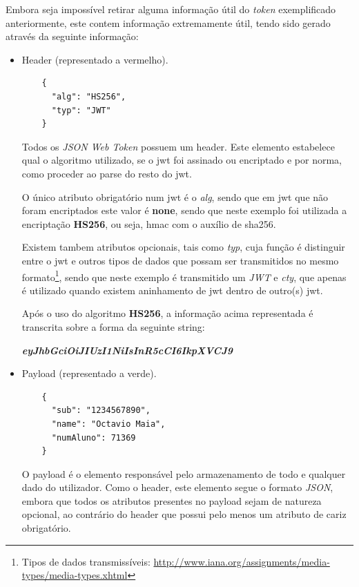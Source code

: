 Embora seja impossível retirar alguma informação útil do \emph{token} exemplificado anteriormente, este contem informação extremamente útil, tendo sido gerado através da seguinte informação:

\begin{itemize}
    \item Header (representado a vermelho).
    \begin{verbatim}
    {
      "alg": "HS256",
      "typ": "JWT"
    }
    \end{verbatim}
    
    Todos os \emph{JSON Web Token} possuem um header. Este elemento estabelece qual o algoritmo utilizado, se o \gls{jwt} foi assinado ou encriptado e por norma, como proceder ao parse do resto do \gls{jwt}.
    
    O único atributo obrigatório num \gls{jwt} é o \emph{alg}, sendo que em \gls{jwt} que não foram encriptados este valor é \textbf{none}, sendo que neste exemplo foi utilizada a encriptação \textbf{HS256}, ou seja, \gls{hmac} com o auxílio de \gls{sha256}.
    
    Existem tambem atributos opcionais, tais como \emph{typ}, cuja função é distinguir entre o \gls{jwt} e outros tipos de dados que possam ser transmitidos no mesmo formato\footnote{Tipos de dados transmissíveis: \url{http://www.iana.org/assignments/media-types/media-types.xhtml}}, sendo que neste exemplo é transmitido um \emph{JWT} e \emph{cty}, que apenas é utilizado quando existem aninhamento de \gls{jwt} dentro de outro(s) \gls{jwt}.
    
    Após o uso do algoritmo \textbf{HS256}, a informação acima representada é transcrita sobre a forma da seguinte string:
    
    \begin{center}
        \textbf{\emph{eyJhbGciOiJIUzI1NiIsInR5cCI6IkpXVCJ9}}
    \end{center}
    
    \newpage
    \item Payload (representado a verde).
    \begin{verbatim}
    {
      "sub": "1234567890",
      "name": "Octavio Maia",
      "numAluno": 71369
    }
    \end{verbatim}
    
    O payload é o elemento responsável pelo armazenamento de todo e qualquer dado do utilizador. Como o header, este elemento segue o formato \emph{JSON}, embora que todos os atributos presentes no payload sejam de natureza opcional, ao contrário do header que possui pelo menos um atributo de cariz obrigatório.
    

\end{itemize}
